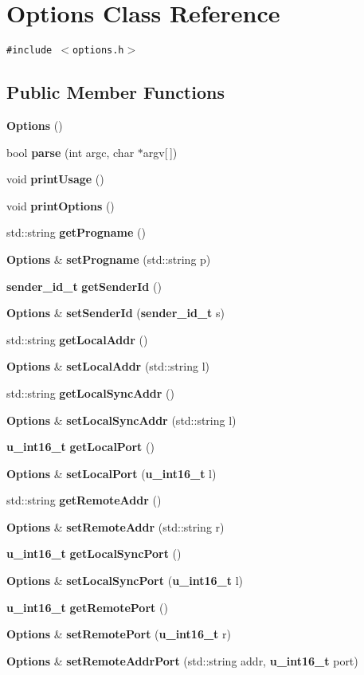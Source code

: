 \section{Options Class Reference}
\label{classOptions}
{\tt \#include $<$options.h$>$}

\subsection*{Public Member Functions}
\begin{CompactItemize}
\item 
{\bf Options} ()
\item 
bool {\bf parse} (int argc, char $\ast$argv[$\,$])
\item 
void {\bf print\-Usage} ()
\item 
void {\bf print\-Options} ()
\item 
std::string {\bf get\-Progname} ()
\item 
{\bf Options} \& {\bf set\-Progname} (std::string p)
\item 
{\bf sender\_\-id\_\-t} {\bf get\-Sender\-Id} ()
\item 
{\bf Options} \& {\bf set\-Sender\-Id} ({\bf sender\_\-id\_\-t} s)
\item 
std::string {\bf get\-Local\-Addr} ()
\item 
{\bf Options} \& {\bf set\-Local\-Addr} (std::string l)
\item 
std::string {\bf get\-Local\-Sync\-Addr} ()
\item 
{\bf Options} \& {\bf set\-Local\-Sync\-Addr} (std::string l)
\item 
{\bf u\_\-int16\_\-t} {\bf get\-Local\-Port} ()
\item 
{\bf Options} \& {\bf set\-Local\-Port} ({\bf u\_\-int16\_\-t} l)
\item 
std::string {\bf get\-Remote\-Addr} ()
\item 
{\bf Options} \& {\bf set\-Remote\-Addr} (std::string r)
\item 
{\bf u\_\-int16\_\-t} {\bf get\-Local\-Sync\-Port} ()
\item 
{\bf Options} \& {\bf set\-Local\-Sync\-Port} ({\bf u\_\-int16\_\-t} l)
\item 
{\bf u\_\-int16\_\-t} {\bf get\-Remote\-Port} ()
\item 
{\bf Options} \& {\bf set\-Remote\-Port} ({\bf u\_\-int16\_\-t} r)
\item 
{\bf Options} \& {\bf set\-Remote\-Addr\-Port} (std::string addr, {\bf u\_\-int16\_\-t} port)

\end{CompactItemize}
